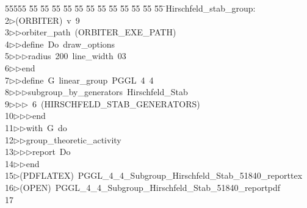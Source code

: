 %
%
\begin{tabbing}
55555 \= 55 \= 55 \= 55 \= 55 \= 55 \= 55 \= 55 \= 55 \= 55 \= 55 \= 55 \= 55 \= \>Hirschfeld\_stab\_group:\\[0pt]
2\>$\triangleright$\>(ORBITER)\ v\ 9\ \\[0pt]
3\>$\triangleright$\>$\triangleright$\>orbiter\_path\ (ORBITER\_EXE\_PATH)\ \\[0pt]
4\>$\triangleright$\>$\triangleright$\>define\ Do\ draw\_options\ \\[0pt]
5\>$\triangleright$\>$\triangleright$\>$\triangleright$\>radius\ 200\ line\_width\ 03\ \\[0pt]
6\>$\triangleright$\>$\triangleright$\>end\ \\[0pt]
7\>$\triangleright$\>$\triangleright$\>define\ G\ linear\_group\ PGGL\ 4\ 4\ \\[0pt]
8\>$\triangleright$\>$\triangleright$\>$\triangleright$\>subgroup\_by\_generators\ Hirschfeld\_Stab\ \\[0pt]
9\>$\triangleright$\>$\triangleright$\>$\triangleright$\ 6\ (HIRSCHFELD\_STAB\_GENERATORS)\ \\[0pt]
10\>$\triangleright$\>$\triangleright$\>$\triangleright$\>end\ \\[0pt]
11\>$\triangleright$\>$\triangleright$\>with\ G\ do\ \\[0pt]
12\>$\triangleright$\>$\triangleright$\>group\_theoretic\_activity\ \\[0pt]
13\>$\triangleright$\>$\triangleright$\>$\triangleright$\>report\ Do\ \\[0pt]
14\>$\triangleright$\>$\triangleright$\>end\\[0pt]
15\>$\triangleright$\>(PDFLATEX)\ PGGL\_4\_4\_Subgroup\_Hirschfeld\_Stab\_51840\_reporttex\\[0pt]
16\>$\triangleright$\>(OPEN)\ PGGL\_4\_4\_Subgroup\_Hirschfeld\_Stab\_51840\_reportpdf\\[0pt]
17\>\end{tabbing}
